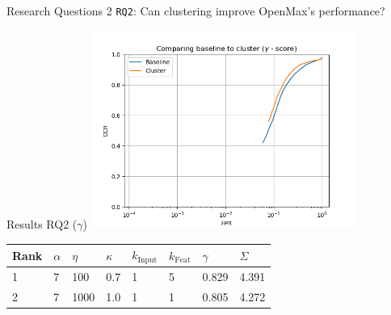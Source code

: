 %
\begin{frame}{Research Questions 2}
	\texttt{RQ2}: Can clustering improve OpenMax's performance?
\end{frame}

\begin{frame}{Results RQ2 ($\gamma$)}
	\centering
	\includegraphics[width=0.65\textwidth]{figures/compare_gamma.png}
	\footnotesize{
		\begin{tabularx}{\textwidth}{ |X|X|X|X|X|X|X|X| }
			\hline
			Rank & $\alpha$ & $\eta$ & $\kappa$ & $k_{\text{Input}}$ & $k_{\text{Feat}}$ & $\gamma$ & $\Sigma$ \\
			\hline
			1    & 7        & 100    & 0.7      & 1                  & 5                 & 0.829    & 4.391    \\
			2    & 7        & 1000   & 1.0      & 1                  & 1                 & 0.805    & 4.272    \\

			\hline
		\end{tabularx}
	}
\end{frame}

